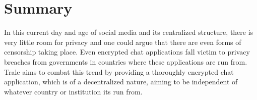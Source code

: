 \chapter{Summary}\label{ch:summary}
In this current day and age of social media and its centralized structure, there is very little room for privacy and
one could argue that there are even forms of censorship taking place.
Even encrypted chat applications fall victim to privacy breaches from governments in countries where these applications
are run from.
Trale aims to combat this trend by providing a thoroughly encrypted chat application, which is of a decentralized
nature, aiming to be independent of whatever country or institution its run from.
